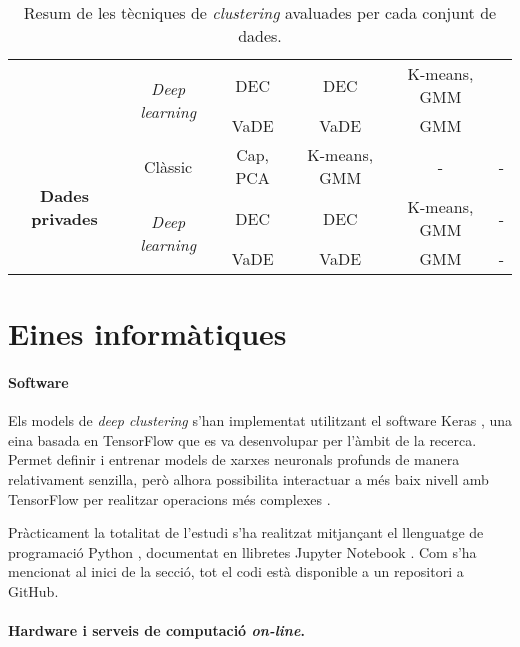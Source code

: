 \documentclass[CAT,BIB]{TFUOC}%
\begin{document}
\begin{sidewaystable}[p]
\begin{tabular}{@{}cccccc@{}}
                & \multirow{2}{*}{\textit{Deep learning}} & DEC & DEC & K-means, GMM &  \\
                &  & VaDE & VaDE & GMM &  \\ \midrule
                \multirow{3}{*}{\textbf{Dades privades}} & Clàssic & Cap, PCA & K-means, GMM & - & - \\
                & \multirow{2}{*}{\textit{Deep learning}} & DEC & DEC & K-means, GMM & - \\
                &  & VaDE & VaDE & GMM & - \\ \bottomrule
            \end{tabular}
            \caption[Tècniques de \textit{clustering} per conjunt de dades]{Resum de les tècniques de \textit{clustering}
                avaluades per cada conjunt de dades.}
            \label{t:metodes_resum}
        \end{sidewaystable}

    \section{Eines informàtiques}
    \label{s:software}

        \paragraph{Software}
            Els models de \textit{deep clustering}
            s'han implementat utilitzant el software Keras \citep{Chollet2015},
            una eina basada en TensorFlow \citep{Ghemawat2016}
            que es va desenvolupar per l'àmbit de la recerca.
            Permet definir i entrenar models de xarxes neuronals profunds
            de manera relativament senzilla,
            però alhora possibilita interactuar a més baix nivell amb TensorFlow
            per realitzar operacions més complexes \citep{Ketkar2021}.

            Pràcticament la totalitat de l'estudi
            s'ha realitzat mitjançant el llenguatge de programació Python \citep{VanRossum2009},
            documentat en llibretes Jupyter Notebook \citep{Kluyver2016}.
            Com s'ha mencionat al inici de la secció,
            tot el codi està disponible a un repositori a GitHub.

        \paragraph{Hardware i serveis de computació \textit{on-line}.}
\end{document}
